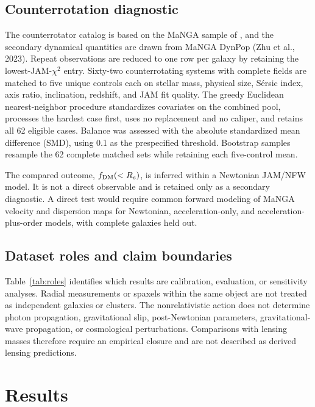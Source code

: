\documentclass[utf8]{FrontiersinHarvard}
\begin{document}
\subsection{Counterrotation diagnostic}\label{counterrotation-diagnostic}

The counterrotator catalog is based on the MaNGA sample of \citet{bevacqua2022}, and the secondary dynamical quantities are drawn from MaNGA DynPop (Zhu et al., 2023). Repeat observations are reduced to one row per galaxy by retaining the lowest-JAM-\(\chi^2\) entry. Sixty-two counterrotating systems with complete fields are matched to five unique controls each on stellar mass, physical size, Sérsic index, axis ratio, inclination, redshift, and JAM fit quality. The greedy Euclidean nearest-neighbor procedure standardizes covariates on the combined pool, processes the hardest case first, uses no replacement and no caliper, and retains all 62 eligible cases. Balance was assessed with the absolute standardized mean difference (SMD), using 0.1 as the prespecified threshold. Bootstrap samples resample the 62 complete matched sets while retaining each five-control mean.

The compared outcome, \(f_{\rm DM}(<R_e)\), is inferred within a Newtonian JAM/NFW model. It is not a direct observable and is retained only as a secondary diagnostic. A direct test would require common forward modeling of MaNGA velocity and dispersion maps for Newtonian, acceleration-only, and acceleration-plus-order models, with complete galaxies held out.

\subsection{Dataset roles and claim boundaries}\label{dataset-roles-and-claim-boundaries}

Table~\ref{tab:roles} identifies which results are calibration, evaluation, or sensitivity analyses. Radial measurements or spaxels within the same object are not treated as independent galaxies or clusters. The nonrelativistic action does not determine photon propagation, gravitational slip, post-Newtonian parameters, gravitational-wave propagation, or cosmological perturbations. Comparisons with lensing masses therefore require an empirical closure and are not described as derived lensing predictions.

\section{Results}\label{results}
\end{document}

